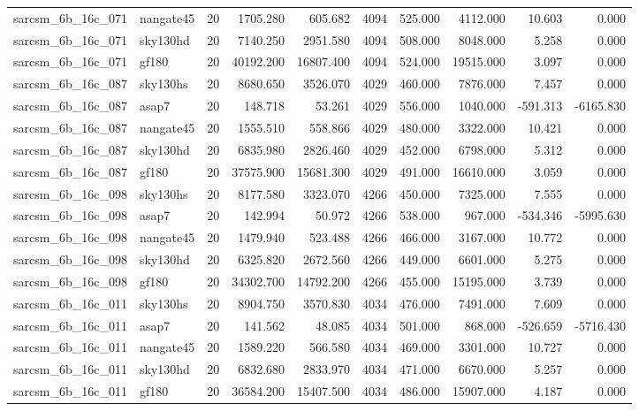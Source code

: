 \documentclass{article}
\begin{document}
\begin{longtable}{llrrrrrrrr}
sarcsm\_6b\_16c\_071 & nangate45 & 20 & 1705.280 & 605.682 & 4094 & 525.000 & 4112.000 & 10.603 & 0.000 \\
sarcsm\_6b\_16c\_071 & sky130hd & 20 & 7140.250 & 2951.580 & 4094 & 508.000 & 8048.000 & 5.258 & 0.000 \\
sarcsm\_6b\_16c\_071 & gf180 & 20 & 40192.200 & 16807.400 & 4094 & 524.000 & 19515.000 & 3.097 & 0.000 \\
sarcsm\_6b\_16c\_087 & sky130hs & 20 & 8680.650 & 3526.070 & 4029 & 460.000 & 7876.000 & 7.457 & 0.000 \\
sarcsm\_6b\_16c\_087 & asap7 & 20 & 148.718 & 53.261 & 4029 & 556.000 & 1040.000 & -591.313 & -6165.830 \\
sarcsm\_6b\_16c\_087 & nangate45 & 20 & 1555.510 & 558.866 & 4029 & 480.000 & 3322.000 & 10.421 & 0.000 \\
sarcsm\_6b\_16c\_087 & sky130hd & 20 & 6835.980 & 2826.460 & 4029 & 452.000 & 6798.000 & 5.312 & 0.000 \\
sarcsm\_6b\_16c\_087 & gf180 & 20 & 37575.900 & 15681.300 & 4029 & 491.000 & 16610.000 & 3.059 & 0.000 \\
sarcsm\_6b\_16c\_098 & sky130hs & 20 & 8177.580 & 3323.070 & 4266 & 450.000 & 7325.000 & 7.555 & 0.000 \\
sarcsm\_6b\_16c\_098 & asap7 & 20 & 142.994 & 50.972 & 4266 & 538.000 & 967.000 & -534.346 & -5995.630 \\
sarcsm\_6b\_16c\_098 & nangate45 & 20 & 1479.940 & 523.488 & 4266 & 466.000 & 3167.000 & 10.772 & 0.000 \\
sarcsm\_6b\_16c\_098 & sky130hd & 20 & 6325.820 & 2672.560 & 4266 & 449.000 & 6601.000 & 5.275 & 0.000 \\
sarcsm\_6b\_16c\_098 & gf180 & 20 & 34302.700 & 14792.200 & 4266 & 455.000 & 15195.000 & 3.739 & 0.000 \\
sarcsm\_6b\_16c\_011 & sky130hs & 20 & 8904.750 & 3570.830 & 4034 & 476.000 & 7491.000 & 7.609 & 0.000 \\
sarcsm\_6b\_16c\_011 & asap7 & 20 & 141.562 & 48.085 & 4034 & 501.000 & 868.000 & -526.659 & -5716.430 \\
sarcsm\_6b\_16c\_011 & nangate45 & 20 & 1589.220 & 566.580 & 4034 & 469.000 & 3301.000 & 10.727 & 0.000 \\
sarcsm\_6b\_16c\_011 & sky130hd & 20 & 6832.680 & 2833.970 & 4034 & 471.000 & 6670.000 & 5.257 & 0.000 \\
sarcsm\_6b\_16c\_011 & gf180 & 20 & 36584.200 & 15407.500 & 4034 & 486.000 & 15907.000 & 4.187 & 0.000 \\

\end{longtable}
\end{document}

